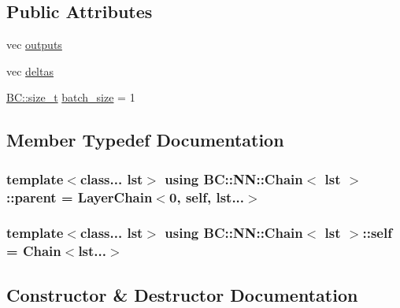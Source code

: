 \subsection*{Public Attributes}
\begin{DoxyCompactItemize}
\item 
vec \hyperlink{structBC_1_1NN_1_1Chain_a2090e18b2f5bf4b2aa751a8abc7ace13}{outputs}
\item 
vec \hyperlink{structBC_1_1NN_1_1Chain_a857ba54a8bbfd9f01c34d225fcaad9f0}{deltas}
\item 
\hyperlink{namespaceBC_a6007cbc4eeec401a037b558910a56173}{B\+C\+::size\+\_\+t} \hyperlink{structBC_1_1NN_1_1Chain_a3c6d769b2e92ff5963ab391d5697b289}{batch\+\_\+size} = 1
\end{DoxyCompactItemize}


\subsection{Member Typedef Documentation}
\subsubsection[{\texorpdfstring{parent}{parent}}]{\setlength{\rightskip}{0pt plus 5cm}template$<$class... lst$>$ using {\bf B\+C\+::\+N\+N\+::\+Chain}$<$ lst $>$\+::{\bf parent} =  {\bf Layer\+Chain}$<$0, {\bf self}, lst...$>$}\hypertarget{structBC_1_1NN_1_1Chain_a32de6795ede484f33f461e161a8ab785}{}\label{structBC_1_1NN_1_1Chain_a32de6795ede484f33f461e161a8ab785}
\subsubsection[{\texorpdfstring{self}{self}}]{\setlength{\rightskip}{0pt plus 5cm}template$<$class... lst$>$ using {\bf B\+C\+::\+N\+N\+::\+Chain}$<$ lst $>$\+::{\bf self} =  {\bf Chain}$<$lst...$>$}\hypertarget{structBC_1_1NN_1_1Chain_a0b49e7c4d6ebb165c42d8d5d8413cfd6}{}\label{structBC_1_1NN_1_1Chain_a0b49e7c4d6ebb165c42d8d5d8413cfd6}


\subsection{Constructor \& Destructor Documentation}
